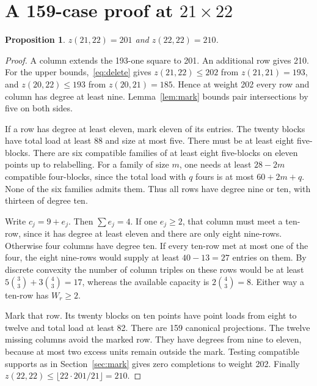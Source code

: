 \documentclass[11pt]{article}
\newtheorem{proposition}[theorem]{Proposition}
\begin{document}
\section{A 159-case proof at \texorpdfstring{$21\times22$}{21 by 22}}\label{sec:201}
\begin{proposition}
$z(21,22)=201$ and $z(22,22)=210$.
\end{proposition}
\begin{proof}
A column extends the 193-one square to 201. An additional row gives 210.
For the upper bounds,~\eqref{eq:delete} gives $z(21,22)\le202$ from
$z(21,21)=193$, and $z(20,22)\le193$ from $z(20,21)=185$.
Hence at weight 202 every row and column has degree at least nine.
Lemma~\ref{lem:mark} bounds pair intersections by five on both sides.

If a row has degree at least eleven, mark eleven of its entries. The
twenty blocks have total load at least 88 and size at most five. There
must be at least eight five-blocks. There are six compatible families
of at least eight five-blocks on eleven points up to relabelling.
For a family of size $m$, one needs at least $28-2m$ compatible
four-blocks, since the total load with $q$ fours is at most $60+2m+q$.
None of the six families admits them. Thus all rows have degree nine
or ten, with thirteen of degree ten.

Write $c_j=9+e_j$. Then $\sum e_j=4$. If one $e_j\ge2$, that column
must meet a ten-row, since it has degree at least eleven and there
are only eight nine-rows. Otherwise four columns have degree ten.
If every ten-row met at most one of the four, the eight nine-rows
would supply at least $40-13=27$ entries on them. By discrete convexity
the number of column triples on these rows would be at least
$5\binom33+3\binom43=17$, whereas the available capacity is
$2\binom43=8$. Either way a ten-row has $W_r\ge2$.

Mark that row. Its twenty blocks on ten points have point loads
from eight to twelve and total load at least 82. There are 159
canonical projections. The twelve missing columns avoid the marked
row. They have degrees from nine to eleven, because at most two excess
units remain outside the mark. Testing compatible supports as in
Section~\ref{sec:mark} gives zero completions to weight 202.
Finally $z(22,22)\le\lfloor22\cdot201/21\rfloor=210$.
\end{proof}
\end{document}
